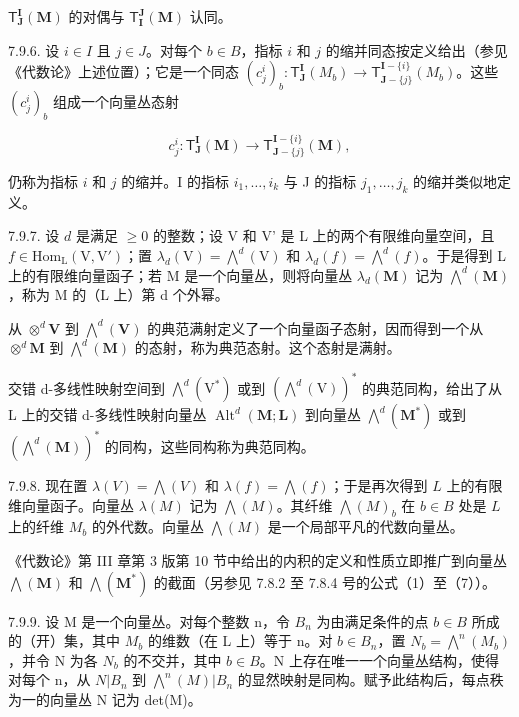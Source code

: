 \(\mathsf{T}_{\mathbf{J}}^{\mathbf{I}}(\mathbf{M})\) 的对偶与 \(\mathsf{T}_{\mathbf{I}}^{\mathbf{J}}(\mathbf{M})\) 认同。

7.9.6. 设 \(i \in I\) 且 \(j \in J\)。对每个 \(b \in B\)，指标 \(i\) 和 \(j\) 的缩并同态按定义给出（参见《代数论》上述位置）；它是一个同态 \((c_j^i)_b: \mathsf{T}_{\mathbf{J}}^{\mathbf{I}}(M_b) \to \mathsf{T}_{\mathbf{J}-\{j\}}^{\mathbf{I}-\{i\}}(M_b)\)。这些 \((c_j^i)_b\) 组成一个向量丛态射

\[
c _ {j} ^ {i}: \mathsf {T} _ {\mathbf {J}} ^ {\mathbf {I}} (\mathbf {M}) \to \mathsf {T} _ {\mathbf {J} - \{j \}} ^ {\mathbf {I} - \{i \}} (\mathbf {M}),
\]

仍称为指标 \(i\) 和 \(j\) 的缩并。I 的指标 \(i_{1},\ldots,i_{k}\) 与 J 的指标 \(j_{1},\ldots,j_{k}\) 的缩并类似地定义。

7.9.7. 设 \(d\) 是满足 \(\geqslant 0\) 的整数；设 V 和 V' 是 L 上的两个有限维向量空间，且 \(f \in \mathrm{Hom}_{\mathrm{L}}(\mathrm{V}, \mathrm{V}')\)；置 \(\lambda_{d}(\mathrm{V}) = \bigwedge^{d}(\mathrm{V})\) 和 \(\lambda_{d}(f) = \bigwedge^{d}(f)\)。于是得到 L 上的有限维向量函子；若 M 是一个向量丛，则将向量丛 \(\lambda_{d}(\mathbf{M})\) 记为 \(\bigwedge^{d}(\mathbf{M})\)，称为 M 的（L 上）第 d 个外幂。

从 \(\otimes^{d}\mathbf{V}\) 到 \(\bigwedge^{d}(\mathbf{V})\) 的典范满射定义了一个向量函子态射，因而得到一个从 \(\otimes^{d}\mathbf{M}\) 到 \(\bigwedge^{d}(\mathbf{M})\) 的态射，称为典范态射。这个态射是满射。

交错 d-多线性映射空间到 \(\bigwedge^{d}(\mathrm{V}^{*})\) 或到 \((\bigwedge^{d}(\mathrm{V}))^{*}\) 的典范同构，给出了从 L 上的交错 d-多线性映射向量丛 \(\operatorname{Alt}^{d}(\mathbf{M};\mathbf{L})\) 到向量丛 \(\bigwedge^{d}(\mathbf{M}^{*})\) 或到 \((\bigwedge^{d}(\mathbf{M}))^{*}\) 的同构，这些同构称为典范同构。

7.9.8. 现在置 \(\lambda(V) = \bigwedge(V)\) 和 \(\lambda(f) = \bigwedge(f)\)；于是再次得到 \(L\) 上的有限维向量函子。向量丛 \(\lambda(M)\) 记为 \(\bigwedge(M)\)。其纤维 \(\bigwedge(M)_b\) 在 \(b \in B\) 处是 \(L\) 上的纤维 \(M_b\) 的外代数。向量丛 \(\bigwedge(M)\) 是一个局部平凡的代数向量丛。

《代数论》第 III 章第 3 版第 10 节中给出的内积的定义和性质立即推广到向量丛 \(\bigwedge(\mathbf{M})\) 和 \(\bigwedge(\mathbf{M}^{*})\) 的截面（另参见 7.8.2 至 7.8.4 号的公式（1）至（7））。

7.9.9. 设 M 是一个向量丛。对每个整数 n，令 \(B_{n}\) 为由满足条件的点 \(b \in B\) 所成的（开）集，其中 \(M_{b}\) 的维数（在 L 上）等于 n。对 \(b \in B_{n}\)，置 \(N_{b} = \bigwedge^{n}(M_{b})\)，并令 N 为各 \(N_{b}\) 的不交并，其中 \(b \in B\)。N 上存在唯一一个向量丛结构，使得对每个 n，从 \(N|B_{n}\) 到 \(\bigwedge^{n}(M)|B_{n}\) 的显然映射是同构。赋予此结构后，每点秩为一的向量丛 N 记为 det(M)。

